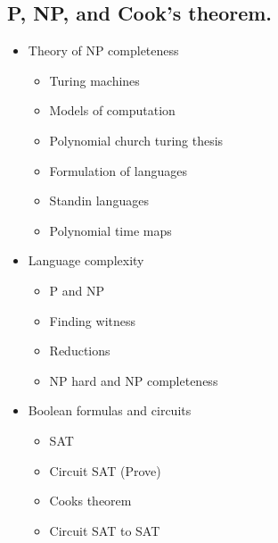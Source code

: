 \documentclass[11pt]{article}
\begin{document}
\subsection{P, NP, and Cook's theorem.}
\label{sec:org8194c07}
\begin{itemize}
\item Theory of NP completeness
\begin{itemize}
\item Turing machines
\item Models of computation
\item Polynomial church turing thesis
\item Formulation of languages
\item Standin languages
\item Polynomial time maps
\end{itemize}

\item Language complexity
\begin{itemize}
\item P and NP
\item Finding witness
\item Reductions
\item NP hard and NP completeness
\end{itemize}

\item Boolean formulas and circuits
\begin{itemize}
\item SAT
\item Circuit SAT (Prove)
\item Cooks theorem
\item Circuit SAT to SAT
\end{itemize}
\end{itemize}
\end{document}
